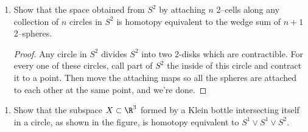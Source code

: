 \documentclass[12pt,letterpaper]{article}
\begin{document}
\begin{enumerate}
\begin{proof}
What regions do these equations describe? First consider (1). In the left hand equation, $t$ determines the radius of an $m-$sphere, so letting $t$ vary gives an $m+1$ disk. Using $t$ in the right-hand equation gives an $n$-sphere whose radius is a function of $t$. Thus, for every point in an $m+1$ disk of radius $\sqrt{\tfrac{1}{2}}$, we can choose any point in an $n$-sphere to satisfy (1). Thus (1) determines a region which is the shape of $D^{m+1}\times S^n$.

Using similar reasoning, we can see that (2) determines a region which is the shape of ${S^m\times D^{n+1}}$. Finally, we observe that for $t=s=\frac{1}{2}$, both equations determine the same set of points $S^m\times S^n$. Thus an $m+n+1$-sphere is the same homotopy type as $$ {S^m\times D^{n+1}\bigsqcup_{S^m\times S^n} D^{m+1}\times S^n},$$ which is $S^m*S^n$. \end{proof}

\item Show that the space obtained from $S^2$ by attaching $n$ 2--cells along any collection of $n$ circles in $S^2$  is homotopy equivalent to the wedge sum of $n + 1$ 2--spheres.
\begin{proof}
Any circle in $S^2$ divides $S^2$ into two 2-disks which are contractible. For every one of these circles, call part of $S^2$ the inside of this circle and contract it to a point. Then move the attaching maps so all the spheres are attached to each other at the same point, and we're done. 
\end{proof}
\end{enumerate}

\pagebreak
\vspace*{-3ex}
\begin{minipage}{0.8\linewidth}
\begin{enumerate}[resume]
\item Show that the subspace $X \subset \R^3$ formed by a Klein bottle intersecting itself in a circle, as shown in the figure, is homotopy equivalent to $S^1\vee S^1  \vee S^2$. \\\\
\end{enumerate}
\end{minipage}
\begin{minipage}{0.2\linewidth}
\end{minipage}
\end{document}
